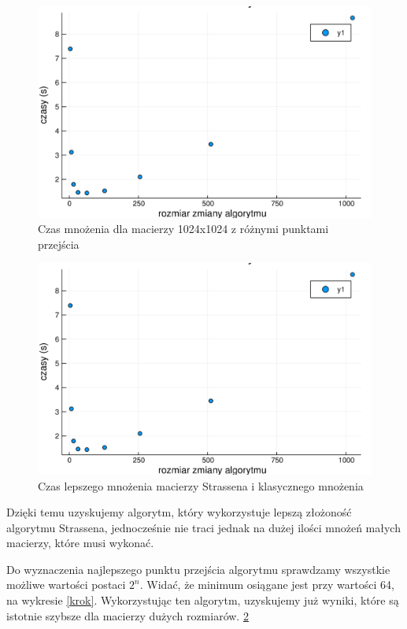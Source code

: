 \documentclass[paper=a4, fontsize=11pt]{scrartcl} %
\numberwithin{equation}{section} %
\numberwithin{figure}{section} %
\numberwithin{table}{section} %
\begin{document}
\begin{figure}[h!]
  \includegraphics[width=\linewidth]{krok.jpg}
  \caption{Czas mnożenia dla macierzy 1024x1024 z różnymi punktami przejścia}
  \label{szybkosc}
\end{figure}
\begin{figure}[h!]
  \includegraphics[width=\linewidth]{szybkosc.jpg}
  \caption{Czas lepszego mnożenia macierzy Strassena i klasycznego mnożenia}
  \label{szybkosc}
\end{figure}
 
Dzięki temu uzyskujemy algorytm, który wykorzystuje lepszą złożoność algorytmu Strassena, 
jednocześnie nie traci jednak na dużej ilości mnożeń małych macierzy, które musi wykonać.\medbreak

Do wyznaczenia najlepszego punktu przejścia algorytmu sprawdzamy wszystkie możliwe wartości postaci ${2^n}$.
Widać, że minimum osiągane jest przy wartości 64, na wykresie \ref{krok}.\medbreak
Wykorzystując ten algorytm, uzyskujemy już wyniki, które są istotnie szybsze dla macierzy dużych rozmiarów. \ref{szybkosc}
\FloatBarrier
\end{document}
